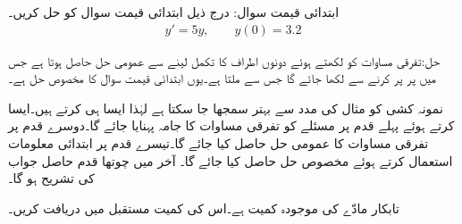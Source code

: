 ابتدائی قیمت سوال: درج ذیل ابتدائی قیمت سوال کو حل کریں۔
\begin{align*}
y'=5y,\quad \quad y(0)=3.2
\end{align*}

حل:تفرقی مساوات کو  لکھتے ہوئے دونوں اطراف کا تکمل لینے سے  عمومی حل حاصل ہوتا ہے جس میں  پر  پر کرنے سے  لکھا جائے گا جس سے  ملتا ہے۔یوں ابتدائی قیمت سوال کا مخصوص حل  ہے۔

نمونہ کشی کو مثال کی مدد سے بہتر سمجھا جا سکتا ہے لہٰذا ایسا ہی کرتے ہیں۔ایسا کرتے ہوئے پہلے قدم پر  مسئلے کو تفرقی مساوات کا جامہ پہنایا جائے گا۔دوسرے قدم پر تفرقی مساوات کا عمومی حل حاصل کیا جائے گا۔تیسرے قدم پر ابتدائی معلومات استعمال کرتے ہوئے مخصوص حل حاصل کیا جائے گا۔ آخر میں چوتھا قدم حاصل جواب کی تشریح ہو گا۔ 

تابکار  مادّے کی موجودہ کمیت  ہے۔اس کی کمیت  مستقبل میں دریافت کریں۔

